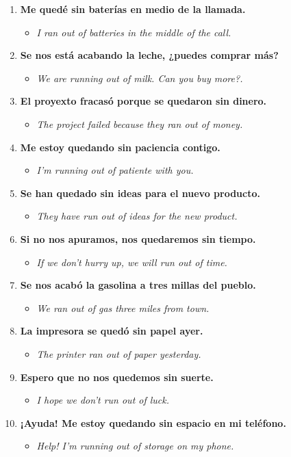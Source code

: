 \documentclass[
10pt, %
a4paper, %
oneside, %
headinclude,footinclude, %
BCOR5mm, %
]{scrartcl}
\begin{document}
\begin{enumerate}
	\item \textbf{Me quedé sin baterías en medio de la llamada.}
	\begin{itemize}
		\item \textit{I ran out of batteries in the middle of the call.}
	\end{itemize}
	\item \textbf{Se nos está acabando la leche, ¿puedes comprar más?}
	\begin{itemize}
		\item \textit{We are running out of milk. Can you buy more?.}
	\end{itemize}
	\item \textbf{El proyexto fracasó porque se quedaron sin dinero.}
	\begin{itemize}
		\item \textit{The project failed because they ran out of money.}
	\end{itemize}
	\item \textbf{Me estoy quedando sin paciencia contigo.}
	\begin{itemize}
		\item \textit{I'm running out of patiente with you.}
	\end{itemize}
	\item \textbf{Se han quedado sin ideas para el nuevo producto.}
	\begin{itemize}
		\item \textit{They have run out of ideas for the new product.}
	\end{itemize}
	\item \textbf{Si no nos apuramos, nos quedaremos sin tiempo.}
	\begin{itemize}
		\item \textit{If we don't hurry up, we will run out of time.}
	\end{itemize}
	\item \textbf{Se nos acabó la gasolina a tres millas del pueblo.}
	\begin{itemize}
		\item \textit{We ran out of gas three miles from town.}
	\end{itemize}
	\item \textbf{La impresora se quedó sin papel ayer.}
	\begin{itemize}
		\item \textit{The printer ran out of paper yesterday.}
	\end{itemize}
	\item \textbf{Espero que no nos quedemos sin suerte.}
	\begin{itemize}
		\item \textit{I hope we don't run out of luck.}
	\end{itemize}
	\item \textbf{¡Ayuda! Me estoy quedando sin espacio en mi teléfono.}
	\begin{itemize}
		\item \textit{Help! I'm running out of storage on my phone.}
	\end{itemize}
\end{enumerate}
\end{document}
